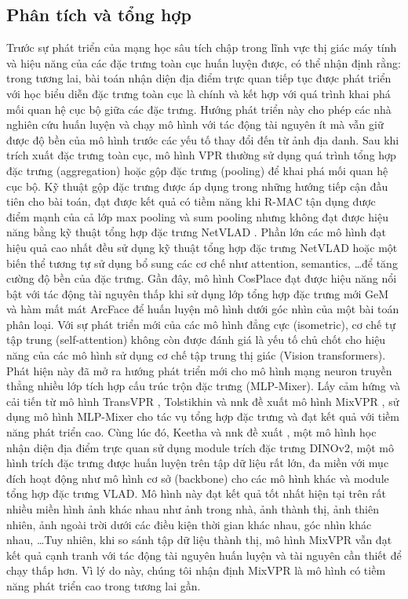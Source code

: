 \subsection{Phân tích và tổng hợp}

Trước sự phát triển của mạng học sâu tích chập trong lĩnh vực thị giác máy tính và hiệu năng của các đặc trưng toàn cục huấn luyện được, có thể nhận định rằng: trong tương lai, bài toán nhận diện địa điểm trực quan tiếp tục được phát triển với học biểu diễn đặc trưng toàn cục là chính và kết hợp với quá trình khai phá mối quan hệ cục bộ giữa các đặc trưng. Hướng phát triển này cho phép các nhà nghiên cứu huấn luyện và chạy mô hình với tác động tài nguyên ít mà vẫn giữ được độ bền của mô hình trước các yếu tố thay đổi đến từ ảnh địa danh. Sau khi trích xuất đặc trưng toàn cục, mô hình VPR thường sử dụng quá trình tổng hợp đặc trưng (aggregation) hoặc gộp đặc trưng (pooling) để khai phá mối quan hệ cục bộ. Kỹ thuật gộp đặc trưng được áp dụng trong những hướng tiếp cận đầu tiên cho bài toán, đạt được kết quả có tiềm năng khi R-MAC \cite{imageSearchKernel} tận dụng được điểm mạnh của cả lớp max pooling và sum pooling nhưng không đạt được hiệu năng bằng kỹ thuật tổng hợp đặc trưng NetVLAD \cite{arandjelovic2016netvlad}. Phần lớn các mô hình đạt hiệu quả cao nhất đều sử dụng kỹ thuật tổng hợp đặc trưng NetVLAD hoặc một biến thể tương tự sử dụng bổ sung các cơ chế như attention, semantics, \dots để tăng cường độ bền của đặc trưng. Gần đây, mô hình CosPlace \cite{berton2022rethinking} đạt được hiệu năng nổi bật với tác động tài nguyên thấp khi sử dụng lớp tổng hợp đặc trưng mới GeM \cite{GeM} và hàm mất mát ArcFace \cite{Deng_2022} để huấn luyện mô hình dưới góc nhìn của một bài toán phân loại. Với sự phát triển mới của các mô hình đẳng cực (isometric), cơ chế tự tập trung (self-attention) không còn được đánh giá là yếu tố chủ chốt cho hiệu năng của các mô hình sử dụng cơ chế tập trung thị giác (Vision transformers). Phát hiện này đã mở ra hướng phát triển mới cho mô hình mạng neuron truyền thẳng nhiều lớp tích hợp cấu trúc trộn đặc trưng (MLP-Mixer). Lấy cảm hứng và cải tiến từ mô hình TransVPR \cite{wang2022transvpr}, Tolstikhin và nnk đề xuất mô hình MixVPR \cite{alibey2023mixvpr}, sử dụng mô hình MLP-Mixer cho tác vụ tổng hợp đặc trưng và đạt kết quả với tiềm năng phát triển cao. Cùng lúc đó, Keetha và nnk đề xuất \cite{keetha2023anyloc}, một mô hình học nhận diện địa điểm trực quan sử dụng module trích đặc trưng DINOv2, một mô hình trích đặc trưng được huấn luyện trên tập dữ liệu rất lớn, đa miền với mục đích hoạt động như mô hình cơ sở (backbone) cho các mô hình khác và module tổng hợp đặc trưng VLAD. Mô hình này đạt kết quả tốt nhất hiện tại trên rất nhiều miền hình ảnh khác nhau như ảnh trong nhà, ảnh thành thị, ảnh thiên nhiên, ảnh ngoài trời dưới các điều kiện thời gian khác nhau, góc nhìn khác nhau, \dots Tuy nhiên, khi so sánh tập dữ liệu thành thị, mô hình MixVPR vẫn đạt kết quả cạnh tranh với tác động tài nguyên huấn luyện và tài nguyên cần thiết để chạy thấp hơn. Vì lý do này, chúng tôi nhận định MixVPR là mô hình có tiềm năng phát triển cao trong tương lai gần.
